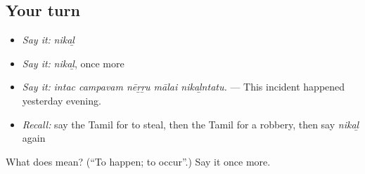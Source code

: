 \subsection*{Your turn}
\begin{itemize}
\raggedright
  \item \emph{Say it:} \emph{nikaḻ}
  \item \emph{Say it:} \emph{nikaḻ}, once more
  \item \emph{Say it:} \emph{intac campavam nēṟṟu mālai nikaḻntatu.} — This incident happened yesterday evening.
  \item \emph{Recall:} say the Tamil for to steal, then the Tamil for a robbery, then say \emph{nikaḻ} again
\end{itemize}

\begin{tcolorbox}[breakable,colback=teal!4,colframe=teal!35!black,title={Before you move on}]
What does  mean? (\textquotedblleft{}To happen; to occur\textquotedblright{}.) Say it once more.
\end{tcolorbox}
